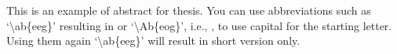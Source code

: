 
This is an example of abstract for thesis. You can use abbreviations such as {`\textbackslash ab\{eeg\}'} resulting in   or {`\textbackslash Ab\{eog\}'}, i.e., , to use capital for the starting letter. Using them again {`\textbackslash ab\{eeg\}'} will result in  short version only.

